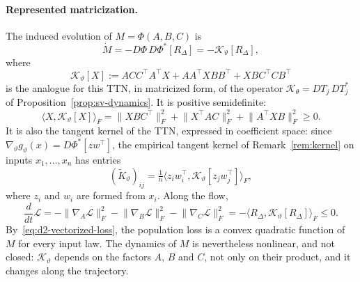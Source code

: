 \documentclass[11pt]{article}
\newcommand{\ip}[2]{\langle #1,#2\rangle}
\newcommand{\norm}[1]{\lVert #1\rVert}
\theoremstyle{definition}
\numberwithin{equation}{section}
\begin{document}
\paragraph{Represented matricization.}
The induced evolution of $M=\Phi(A,B,C)$ is
\begin{equation}\label{eq:d2-M-flow}
\dot M=-D\Phi\,D\Phi^*[R_\Delta]=-\mathcal K_\vartheta[R_\Delta],
\end{equation}
where
\begin{equation}\label{eq:d2-K-operator}
\mathcal K_\vartheta[X]:=ACC^\top A^\top X+AA^\top XBB^\top+XBC^\top CB^\top
\end{equation}
is the analogue for this TTN, in matricized form, of the operator $\mathcal K_\theta=DT_j\,DT_j^*$ of Proposition~\ref{prop:sv-dynamics}. It is positive semidefinite:
\begin{equation}\label{eq:d2-K-positive}
\ip{X}{\mathcal K_\vartheta[X]}_F=\norm{XBC^\top}_F^2+\norm{X^\top AC}_F^2+\norm{A^\top XB}_F^2\ge0.
\end{equation}
It is also the tangent kernel of the TTN, expressed in coefficient space: since $\nabla_\vartheta g_\vartheta(x)=D\Phi^*[zw^\top]$, the empirical tangent kernel of Remark~\ref{rem:kernel} on inputs $x_1,\dots,x_n$ has entries
\[
(\tilde K_\vartheta)_{ij}=\tfrac1n\ip{z_iw_i^\top}{\mathcal K_\vartheta[z_jw_j^\top]}_F,
\]
where $z_i$ and $w_i$ are formed from $x_i$. Along the flow,
\begin{equation}\label{eq:d2-loss-decay}
\frac{d}{dt}\mathcal L=-\norm{\nabla_A\mathcal L}_F^2-\norm{\nabla_B\mathcal L}_F^2-\norm{\nabla_C\mathcal L}_F^2=-\ip{R_\Delta}{\mathcal K_\vartheta[R_\Delta]}_F\le0.
\end{equation}
By~\eqref{eq:d2-vectorized-loss}, the population loss is a convex quadratic function of $M$ for every input law. The dynamics of $M$ is nevertheless nonlinear, and not closed: $\mathcal K_\vartheta$ depends on the factors $A$, $B$ and $C$, not only on their product, and it changes along the trajectory.
\end{document}
